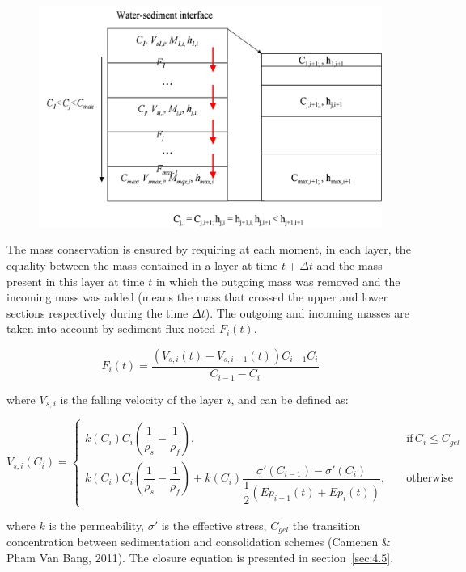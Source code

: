 \begin{figure}[H]
\begin{center}
\includegraphics[scale=0.075,angle=0]{graphics/figNEW.png}
\end{center}
\end{figure}

The mass conservation is ensured by requiring at each moment, in each layer, the
equality between the mass contained in a layer at time $t + \Delta t$ and the
mass present in this layer at time $t$ in which the outgoing mass was removed
and the incoming mass was added (means the mass that crossed the upper and
lower sections respectively during the time $\Delta t$). The outgoing and
incoming masses are taken into account by sediment flux noted $F_i(t)$.

\begin{equation}
F_i(t) = \dfrac{(V_{s,i}(t) -V_{s,i-1}(t))C_{i-1} C_i}{C_{i-1} - C_i} 
\end{equation}

where $V_{s,i}$ is the falling velocity of the layer $i$, and can be
defined as:

\begin{equation}
V_{s,i}(C_i) =\left\{\begin{array}{ll}
k(C_i)C_i\left(\dfrac{1}{\rho_s} - 
\dfrac{1}{\rho_f} \right), & \quad\text{if}\,C_i \leq C_{gel}\\
k(C_i)C_i \left(\dfrac{1}{\rho_s} -\dfrac{1}{\rho_f} \right) 
+ k(C_i)\dfrac{\sigma'(C_{i-1})-\sigma'(C_{i} )}{\dfrac{1}{2}(Ep_{i-1}(t)+Ep_i(t))}, & \quad\text{otherwise}
\end{array}
\right.
\end{equation}

where $k$ is the permeability, $\sigma'$ is the effective stress, $C_{gel}$ 
the transition concentration between sedimentation and consolidation
schemes (Camenen \& Pham Van Bang, 2011). The closure equation is presented
in section~\ref{sec:4.5}.

